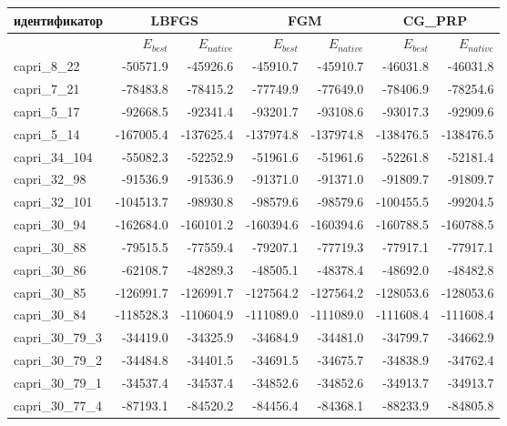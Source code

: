   \begin{table}[h]
    \scriptsize
    \begin{center}
    \begin{tabular}{ l | r | r | r | r | r | r }
      идентификатор 
      & \multicolumn{2}{c|}{LBFGS}
      & \multicolumn{2}{c|}{FGM} 
      & \multicolumn{2}{c}{CG\_PRP} 
      \\ 
      \hline
       & $E_{best}$ & $E_{native}$
       & $E_{best}$ & $E_{native}$
       & $E_{best}$ & $E_{native}$
       \\
       capri\_8\_22 & -50571.9 & -45926.6 & -45910.7 & -45910.7 & -46031.8 & -46031.8 \\
       capri\_7\_21 & -78483.8 & -78415.2 & -77749.9 & -77649.0 & -78406.9 & -78254.6 \\
       capri\_5\_17 & -92668.5 & -92341.4 & -93201.7 & -93108.6 & -93017.3 & -92909.6 \\
       capri\_5\_14 & -167005.4 & -137625.4 & -137974.8 & -137974.8 & -138476.5 & -138476.5 \\
       capri\_34\_104 & -55082.3 & -52252.9 & -51961.6 & -51961.6 & -52261.8 & -52181.4 \\
       capri\_32\_98 & -91536.9 & -91536.9 & -91371.0 & -91371.0 & -91809.7 & -91809.7 \\
       capri\_32\_101 & -104513.7 & -98930.8 & -98579.6 & -98579.6 & -100455.5 & -99204.5 \\
       capri\_30\_94 & -162684.0 & -160101.2 & -160394.6 & -160394.6 & -160788.5 & -160788.5 \\
       capri\_30\_88 & -79515.5 & -77559.4 & -79207.1 & -77719.3 & -77917.1 & -77917.1 \\
       capri\_30\_86 & -62108.7 & -48289.3 & -48505.1 & -48378.4 & -48692.0 & -48482.8 \\
       capri\_30\_85 & -126991.7 & -126991.7 & -127564.2 & -127564.2 & -128053.6 & -128053.6 \\
       capri\_30\_84 & -118528.3 & -110604.9 & -111089.0 & -111089.0 & -111608.4 & -111608.4 \\
       capri\_30\_79\_3 & -34419.0 & -34325.9 & -34684.9 & -34481.0 & -34799.7 & -34662.9 \\
       capri\_30\_79\_2 & -34484.8 & -34401.5 & -34691.5 & -34675.7 & -34838.9 & -34762.4 \\
       capri\_30\_79\_1 & -34537.4 & -34537.4 & -34852.6 & -34852.6 & -34913.7 & -34913.7 \\
       capri\_30\_77\_4 & -87193.1 & -84520.2 & -84456.4 & -84368.1 & -88233.9 & -84805.8 \\

\end{tabular}
\end{center}
\end{table}
